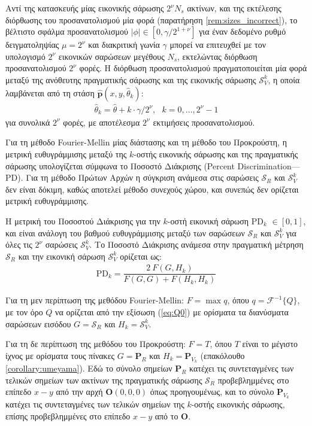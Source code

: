 Αντί της κατασκευής μίας εικονικής σάρωσης $2^\nu N_s$ ακτίνων, και της
εκτέλεσης διόρθωσης του προσανατολισμού μία φορά (παρατήρηση
\ref{rem:sizes_incorrect}), το βέλτιστο σφάλμα προσανατολισμού $|\phi| \in
[0,\gamma / 2^{1+\nu}]$ για έναν δεδομένο ρυθμό δειγματοληψίας $\mu = 2^\nu$
και διακριτική γωνία $\gamma$ μπορεί να επιτευχθεί με τον υπολογισμό
$2^\nu$ εικονικών σαρώσεων μεγέθους $N_s$, εκτελώντας διόρθωση προσανατολισμού
$2^\nu$ φορές. Η διόρθωση προσανατολισμού πραγματοποιείται μία φορά μεταξύ της
ανόθευτης πραγματικής σάρωσης και της εικονικής σάρωσης $\mathcal{S}_V^k$, η
οποία λαμβάνεται από τη στάση $\hat{\bm{p}}(x,y,\hat{\theta}_k)$:
\begin{align}
  \hat{\theta}_k = \hat{\theta} + k \cdot \gamma / 2^\nu, \ \ \ k = 0,\dots,2^\nu-1 \label{eq:theta_k_theseus}
\end{align}
για συνολικά $2^\nu$ φορές, με αποτέλεσμα $2^\nu$ εκτιμήσεις προσανατολισμού.

Για τη μέθοδο Fourier-Mellin μίας διάστασης και τη μέθοδο του Προκρούστη, η
μετρική ευθυγράμμισης μεταξύ της $k$-οστής εικονικής σάρωσης και της
πραγματικής σάρωσης υπολογίζεται σύμφωνα το Ποσοστό Διάκρισης (Percent
Discrimination---PD). Για τη μέθοδο Πρώτων Αρχών η σύγκριση ανάμεσα
στις σαρώσεις $\mathcal{S}_R$ και $\mathcal{S}_V^k$ δεν είναι δόκιμη, καθώς
αποτελεί μέθοδο συνεχούς χώρου, και συνεπώς δεν ορίζεται μετρική ευθυγράμμισης.

Η μετρική του Ποσοστού Διάκρισης για την $k$-οστή εικονική σάρωση PD$_k$ $\in
[0,1]$, και είναι ανάλογη του βαθμού ευθυγράμμισης μεταξύ των σαρώσεων
$\mathcal{S}_R$ και $\mathcal{S}_V^k$ για όλες τις $2^\nu$ σαρώσεις
$\mathcal{S}_V^k$. Το Ποσοστό Διάκρισης ανάμεσα στην πραγματική μέτρηση
$\mathcal{S}_R$ και την εικονική σάρωση $\mathcal{S}_V^k$ ορίζεται ως:
\begin{align}
  \text{PD}_k = \dfrac{2 \ F(G,H_k)}{F(G,G) + F(H_k,H_k)} \label{eq:pd}
\end{align}

Για τη μεν περίπτωση της μεθόδου Fourier-Mellin: $F = \max q$, όπου
$q = \mathcal{F}^{-1}\{Q\}$, με τον όρο $Q$ να ορίζεται από την εξίσωση
(\ref{eq:Q0}) με ορίσματα τα διανύσματα σαρώσεων εισόδου $G = \mathcal{S}_R$
και $H_k = \mathcal{S}_V^k$.

Για τη δε περίπτωση της μεθόδου του Προκρούστη: $F = T$, όπου $T$ είναι το
μέγιστο ίχνος με ορίσματα τους πίνακες $G = \bm{P}_R$ και $H_k = \bm{P}_{V_k}$
(επακόλουθο \ref{corollary:umeyama}). Εδώ το σύνολο σημείων $\bm{P}_R$ κατέχει
τις συντεταγμένες των τελικών σημείων των ακτίνων της πραγματικής σάρωσης
$\mathcal{S}_R$ προβεβλημμένες στο επίπεδο $x-y$ από την αρχή $\bm{O}(0,0,0)$
όπως προηγουμένως, και το σύνολο $\bm{P}_{V_k}$ κατέχει τις συντεταγμένες των
τελικών σημείων της $k$-οστής εικονικής σάρωσης, επίσης προβεβλημμένες στο
επίπεδο $x-y$ από το $\bm{O}$.


